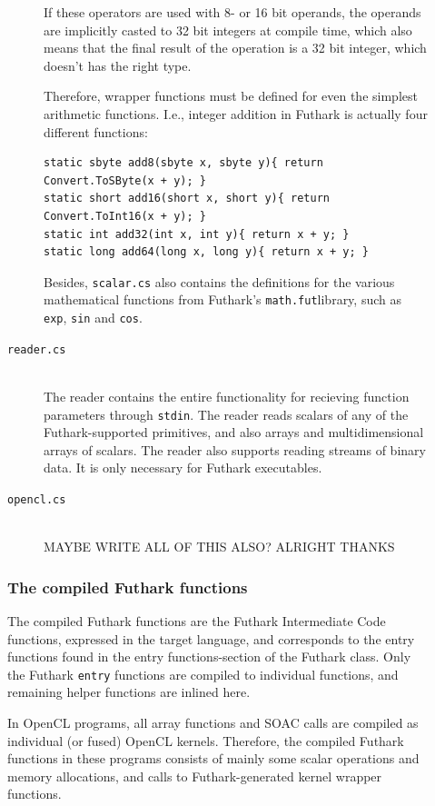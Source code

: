 \begin{description}
\begin{description}
  If these operators are used with 8- or 16 bit operands, the operands are
  implicitly casted to 32 bit integers at compile time, which also means that
  the final result of the operation is a 32 bit integer, which doesn't has the
  right type.

  Therefore, wrapper functions must be defined for even the simplest arithmetic
  functions. I.e., integer addition in \csharp{} Futhark is actually four different
  functions:
\begin{verbatim}
static sbyte add8(sbyte x, sbyte y){ return Convert.ToSByte(x + y); }
static short add16(short x, short y){ return Convert.ToInt16(x + y); }
static int add32(int x, int y){ return x + y; }
static long add64(long x, long y){ return x + y; }
\end{verbatim}

  Besides, \texttt{scalar.cs} also contains the \csharp{} definitions for the various
  mathematical functions from Futhark's \texttt{math.fut}library, such as \texttt{exp},
  \texttt{sin} and \texttt{cos}.

\item[\texttt{reader.cs}] \hfill\\
  The reader contains the entire functionality for recieving function parameters
  through \texttt{stdin}. The reader reads scalars of any of the
  Futhark-supported primitives, and also arrays and multidimensional arrays of
  scalars.
  The reader also supports reading streams of binary data.
  It is only necessary for Futhark executables.
\item[\texttt{opencl.cs}] \hfill\\
  MAYBE WRITE ALL OF THIS ALSO? ALRIGHT THANKS
\end{description}

\subsubsection{The compiled Futhark functions}
  The compiled Futhark functions are the Futhark Intermediate Code functions,
  expressed in the target language, and corresponds to the entry functions found
  in the entry functions-section of the Futhark class.
  Only the Futhark \texttt{entry} functions are compiled to individual functions, and
  remaining helper functions are inlined here.

  In OpenCL programs, all array functions and SOAC calls are compiled as
  individual (or fused) OpenCL kernels. Therefore, the compiled Futhark
  functions in these programs consists of mainly some scalar operations and
  memory allocations, and calls to Futhark-generated kernel wrapper functions.
  

\end{description}

